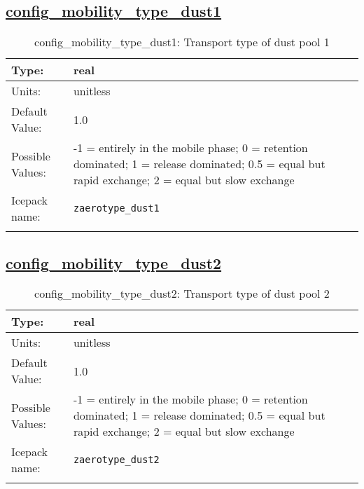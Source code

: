 \subsection[config\_mobility\_type\_dust1]{\hyperref[sec:nm_tab_biogeochemistry]{config\_mobility\_type\_dust1}}
\label{subsec:nm_sec_config_mobility_type_dust1}
\begin{center}
\begin{longtable}{| p{2.0in} || p{4.0in} |}
    \hline
    Type: & real \\
    \hline
    Units: & \si{unitless} \\
    \hline
    Default Value: & 1.0 \\
    \hline
    Possible Values: & -1 = entirely in the mobile phase; 0 = retention dominated; 1 = release dominated; 0.5 = equal but rapid exchange; 2 = equal but slow exchange \\
    \hline
    Icepack name: & \verb+zaerotype_dust1+ \\
    \hline
    \caption{config\_mobility\_type\_dust1: Transport type of dust pool 1}
\end{longtable}
\end{center}
\subsection[config\_mobility\_type\_dust2]{\hyperref[sec:nm_tab_biogeochemistry]{config\_mobility\_type\_dust2}}
\label{subsec:nm_sec_config_mobility_type_dust2}
\begin{center}
\begin{longtable}{| p{2.0in} || p{4.0in} |}
    \hline
    Type: & real \\
    \hline
    Units: & \si{unitless} \\
    \hline
    Default Value: & 1.0 \\
    \hline
    Possible Values: & -1 = entirely in the mobile phase; 0 = retention dominated; 1 = release dominated; 0.5 = equal but rapid exchange; 2 = equal but slow exchange \\
    \hline
    Icepack name: & \verb+zaerotype_dust2+ \\
    \hline
    \caption{config\_mobility\_type\_dust2: Transport type of dust pool 2}
\end{longtable}
\end{center}
